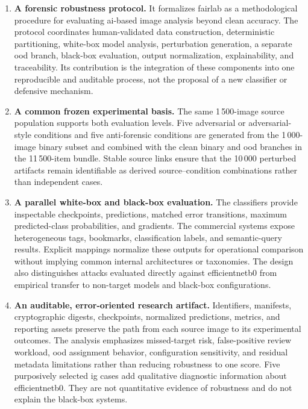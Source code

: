 \begin{enumerate}

\item \textbf{A forensic robustness protocol.}
It formalizes \gls{fairlab} as a methodological procedure for evaluating
\gls{ai}-based image analysis beyond clean accuracy. The protocol coordinates
human-validated data construction, deterministic partitioning, white-box
model analysis, perturbation generation, a separate \gls{ood} branch,
black-box evaluation, output normalization, explainability, and traceability.
Its contribution is the integration of these components into one reproducible
and auditable process, not the proposal of a new classifier or defensive
mechanism.

\item \textbf{A common frozen experimental basis.}
The same 1\,500-image source population supports both evaluation levels. Five
adversarial or adversarial-style conditions and five anti-forensic conditions
are generated from the 1\,000-image binary subset and combined with the clean
binary and \gls{ood} branches in the 11\,500-item bundle. Stable source links
ensure that the 10\,000 perturbed artifacts remain identifiable as derived
source--condition combinations rather than independent cases.

\item \textbf{A parallel white-box and black-box evaluation.}
The classifiers provide inspectable checkpoints, predictions, matched error
transitions, maximum predicted-class probabilities, and gradients. The
commercial systems expose heterogeneous tags, bookmarks, classification
labels, and semantic-query results. Explicit mappings normalize these outputs
for operational comparison without implying common internal architectures or
taxonomies. The design also distinguishes attacks evaluated directly against
\gls{efficientnetb0} from empirical transfer to non-target models and
black-box configurations.

\item \textbf{An auditable, error-oriented research artifact.}
Identifiers, manifests, cryptographic digests, checkpoints, normalized
predictions, metrics, and reporting assets preserve the path from each source
image to its experimental outcomes. The analysis emphasizes missed-target risk,
false-positive review workload, \gls{ood} assignment behavior, configuration
sensitivity, and residual metadata limitations rather than reducing robustness
to one score. Five purposively selected \gls{ig} cases add qualitative
diagnostic information about \gls{efficientnetb0}. They are not quantitative
evidence of robustness and do not explain the black-box systems.

\end{enumerate}

